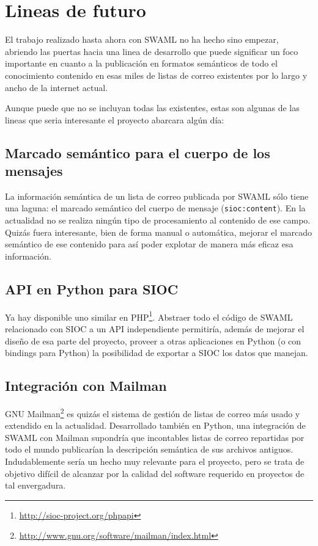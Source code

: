 
\section{Lineas de futuro}

El trabajo realizado hasta ahora con SWAML no ha hecho sino empezar, abriendo las 
puertas hacia una linea de desarrollo que puede significar un foco importante
en cuanto a la publicación en formatos semánticos de todo el conocimiento contenido
en esas miles de listas de correo existentes por lo largo y ancho de la internet
actual.

Aunque puede que no se incluyan todas las existentes, estas son algunas de las lineas
que seria interesante el proyecto abarcara algún día:

\subsection*{Marcado semántico para el cuerpo de los mensajes}

La información semántica de un lista de correo publicada por SWAML sólo tiene una
laguna: el marcado semántico del cuerpo de mensaje (\texttt{sioc:content}). En
la actualidad no se realiza ningún tipo de procesamiento al contenido de ese campo.
Quizás fuera interesante, bien de forma manual o automática, mejorar el marcado
semántico de ese contenido para así poder explotar de manera más eficaz esa 
información.

\subsection*{API en Python para SIOC}

Ya hay disponible uno similar en PHP\footnote{\url{http://sioc-project.org/phpapi}}. 
Abstraer todo el código de SWAML relacionado con SIOC a un API independiente permitiría,
además de mejorar el diseño de esa parte del proyecto, proveer a otras aplicaciones 
en Python (o con bindings para Python) la posibilidad de exportar a SIOC los datos 
que manejan.

\subsection*{Integración con Mailman}

GNU Mailman\footnote{\url{http://www.gnu.org/software/mailman/index.html}} es quizás el
sistema de gestión de listas de correo más usado y extendido en la actualidad. Desarrollado
también en Python, una integración de SWAML con Mailman supondría que incontables listas
de correo repartidas por todo el mundo publicarían la descripción semántica de sus
archivos antiguos. Indudablemente sería un hecho muy relevante para el proyecto, pero
se trata de objetivo difícil de alcanzar por la calidad del software requerido en
proyectos de tal envergadura.

